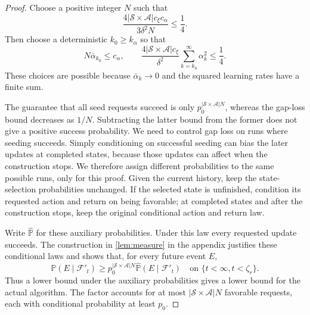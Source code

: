 \begin{proof}
Choose a positive integer $N$ such that
\[
\frac{4|\mathcal S\times\mathcal A|c_\xi c_\alpha}{3\delta^2 N}\le\frac14.
\]
Then choose a deterministic $k_0\ge k_\alpha$ so that
\begin{equation}
\label{eq:choices}
N\bar\alpha_{k_0}\le c_\alpha,
\qquad
\frac{4|\mathcal S\times\mathcal A|c_\xi}{\delta^2}\sum_{k=k_0}^\infty\alpha_k^2\le\frac14.
\end{equation}
These choices are possible because $\bar\alpha_k\to0$ and the squared learning rates have a finite sum.

The guarantee that all seed requests succeed is only $p_0^{|\mathcal S\times\mathcal A|N}$, whereas the gap-loss bound decreases as $1/N$. Subtracting the latter bound from the former does not give a positive success probability. We need to control gap loss on runs where seeding succeeds. Simply conditioning on successful seeding can bias the later updates at completed states, because those updates can affect when the construction stops. We therefore assign different probabilities to the same possible runs, only for this proof. Given the current history, keep the state-selection probabilities unchanged. If the selected state is unfinished, condition its requested action and return on being favorable; at completed states and after the construction stops, keep the original conditional action and return law.

Write $\widehat{\mathbb P}$ for these auxiliary probabilities. Under this law every requested update succeeds. The construction in \autoref{lem:measure} in the appendix justifies these conditional laws and shows that, for every future event $E$,
\begin{equation}
\label{eq:transfer}
\mathbb P(E\mid\mathcal F'_t)
\ge p_0^{|\mathcal S\times\mathcal A|N}\widehat{\mathbb P}(E\mid\mathcal F'_t)
\quad\text{on }\{t<\infty,t<\zeta_r\}.
\end{equation}
Thus a lower bound under the auxiliary probabilities gives a lower bound for the actual algorithm. The factor accounts for at most $|\mathcal S\times\mathcal A|N$ favorable requests, each with conditional probability at least $p_0$.


\end{proof}
